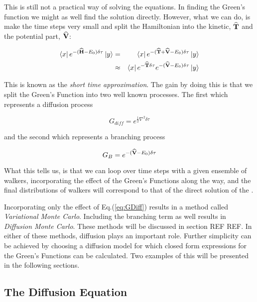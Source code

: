 This is still not a practical way of solving the equations. In finding the Green's function we might as well find the solution directly. However, what we can do, is make the time steps very small and split the Hamiltonian into the kinetic, ${\bf\widehat{T}}$ and the potential part, ${\bf\widehat{V}}$:

\begin{eqnarray}
 \left< x \right|e^{-({\bf\widehat{H}} - E_0)\delta\tau}\left| y \right> &=& \left< x \right|e^{-({\bf\widehat{T}} + {\bf\widehat{V}} - E_0)\delta\tau}\left| y \right> \nonumber \\
                                             &\approx& \left< x \right|e^{-{\bf\widehat{T}}\delta\tau}e^{-({\bf\widehat{V}} - E_0)\delta\tau}\left| y \right>
\end{eqnarray}

This is known as the \textit{short time approximation}. The gain by doing this is that we split the Green's Function into two well known processes. The first which represents a diffusion process

\begin{equation}
 G_{diff} = e^{\frac{1}{2}\nabla^2\delta\tau}
\label{eq:GDiff}
\end{equation}

and the second which represents a branching process

\begin{equation}
 G_{B} = e^{-({\bf\widehat{V}} - E_0)\delta\tau}
 \label{eq:GB}
\end{equation}

What this tells us, is that we can loop over time steps with a given ensemble of walkers, incorporating the effect of the Green's Functions along the way, and the final distributions of walkers will correspond to that of the direct solution of the \schrodinger. 

Incorporating only the effect of Eq.(\ref{eq:GDiff}) results in a method called \textit{Variational Monte Carlo}. Including the branching term as well results in \textit{Diffusion Monte Carlo}. These methods will be discussed in section REF REF. In either of these methods, diffusion plays an important role. Further simplicity can be achieved by choosing a diffusion model for which closed form expressions for the Green's Functions can be calculated. Two examples of this will be presented in the following sections.



\subsection{The Diffusion Equation}

